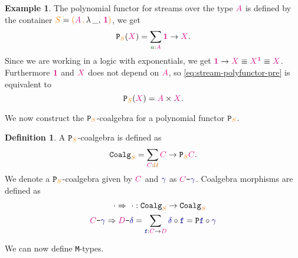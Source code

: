 \documentclass[twoside,11pt,openright]{report}
\theoremstyle{plain} %
\theoremstyle{definition}
\newtheorem{defn}[thm]{Definition}%
\newtheorem{exmp}{Example} %
\theoremstyle{remark}
\newcommand*{\term}[1]{\textcolor{green!30!black}{#1}} %
\newcommand*{\type}[1]{\textcolor{magenta!90!black}{#1}}
\newcommand*{\container}[1]{\textcolor{orange}{#1}}
\newcommand*{\containerpair}[2]{\ensuremath{\colorlet{savedleftcolor}{.}\color{orange}\left(\color{savedleftcolor}#1\,\textcolor{orange}{\mathbf{,}}\,#2\color{orange}\right)\color{savedleftcolor}}}
\newcommand*{\containerpairsimple}[2]{\containerpair{#1}{\lambda\,\_,\,#2}}
\newcommand*{\universe}[1]{\textcolor{orange!80!black}{#1}}
\newcommand*{\unit}{\type{\textbf{1}}}
\newcommand*{\coalg}[2]{#1\texttt{-}#2}
\newcommand*{\function}[1]{\textcolor{blue!60!black}{\ensuremath{\mathtt{#1}}}}
\newcommand*{\typeformer}[1]{\ensuremath{\mathtt{#1}}}
\newcommand*{\functor}[1]{\ensuremath{\mathbf{\mathtt{#1}}}}
\begin{document}
\begin{exmp}
  The polynomial functor for streams over the type \(\type{A}\) is defined by the container \(\container{S} = \containerpairsimple{\type{A}}{\unit}\), we get
  \begin{equation}
    \label{eq:stream-polyfunctor-pre}
    \functor{P}_{\container{S}}(\type{X}) = \sum_{\term{a} : \type{A}} \unit \rightarrow \type{X}.
  \end{equation}
  Since we are working in a logic with exponentials, we get \(\unit \rightarrow \type{X} \equiv \type{X}^{\unit} \equiv \type{X}\). Furthermore \(\unit\) and \(\type{X}\) does not depend on \(\type{A}\), so \eqref{eq:stream-polyfunctor-pre} is equivalent to
  \begin{equation}
    \functor{P}_{\container{S}}(\type{X}) = \type{A} \times \type{X}.
  \end{equation}
\end{exmp}
\noindent We now construct the \(\functor{P}_{\container{S}}\)-coalgebra for a polynomial functor \(\functor{P}_{\container{S}}\).
\begin{defn}
  A \(\functor{P}_{\container{S}}\)-coalgebra is defined as
  \begin{equation}
    \typeformer{Coalg}_{\container{S}} = \sum_{\type{C} : \universe{\mathcal{U}}} \type{C} \rightarrow \functor{P}_{\container{S}}\type{C}.
  \end{equation}
  We denote a \(\functor{P}_{\container{S}}\)-coalgebra given by \(\type{C}\) and \(\function{\gamma}\) as \(\coalg{\type{C}}{\function{\gamma}}\). Coalgebra morphisms are defined as
  \begin{equation}
    \begin{aligned}
      \cdot \Rightarrow ~\cdot &: \typeformer{Coalg}_{\container{S}} \rightarrow \typeformer{Coalg}_{\container{S}} \\
      \coalg{\type{C}}{\function{\gamma}} \Rightarrow \coalg{\type{D}}{\function{\delta}} &= \sum_{\function{f} : \type{C} \rightarrow \type{D}} \function{\delta} \circ \function{f} = \functor{P} \function{f} \circ \function{\gamma}
    \end{aligned}
  \end{equation}
\end{defn}
\noindent We can now define \texttt{M}-types.
\end{document}
